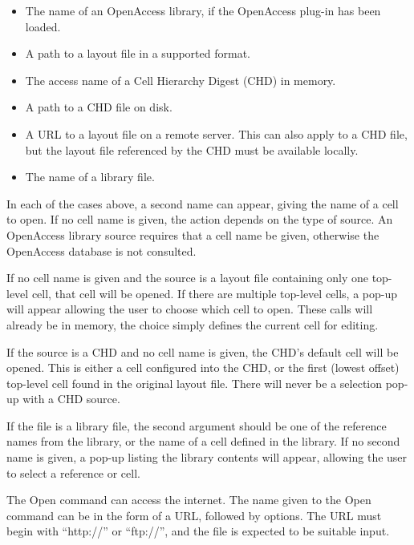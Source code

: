 \begin{itemize}
\item{The name of an OpenAccess library, if the OpenAccess     
plug-in has been loaded.}

\item{A path to a layout file in a supported format.}

\item{The access name of a Cell Hierarchy Digest (CHD) in memory.}

\item{A path to a CHD file on disk.}

\item{A URL to a layout file on a remote server.  This can also apply
to a CHD file, but the layout file referenced by the CHD must be
available locally.}

\item{The name of a library file.}
\end{itemize}

In each of the cases above, a second name can appear, giving the name
of a cell to open.  If no cell name is given, the action depends on
the type of source.
An OpenAccess library source requires that a cell name be given,
otherwise the OpenAccess database is not consulted.

If no cell name is given and the source is a layout file containing
only one top-level cell, that cell will be opened.  If there are
multiple top-level cells, a pop-up will appear allowing the user to
choose which cell to open.  These calls will already be in memory, the
choice simply defines the current cell for editing.

If the source is a CHD and no cell name is given, the CHD's default
cell will be opened.  This is either a cell configured into the CHD,
or the first (lowest offset) top-level cell found in the original
layout file.  There will never be a selection pop-up with a CHD
source.

If the file is a library file, the second argument should be one of
the reference names from the library, or the name of a cell defined in
the library.  If no second name is given, a pop-up listing the library
contents will appear, allowing the user to select a reference or cell.

The {\cb Open} command can access the internet.  The name given to the
{\cb Open} command can be in the form of a URL, followed by options. 
The URL must begin with ``{\vt http://}'' or ``{\vt ftp://}'', and the
file is expected to be suitable {\Xic} input.

